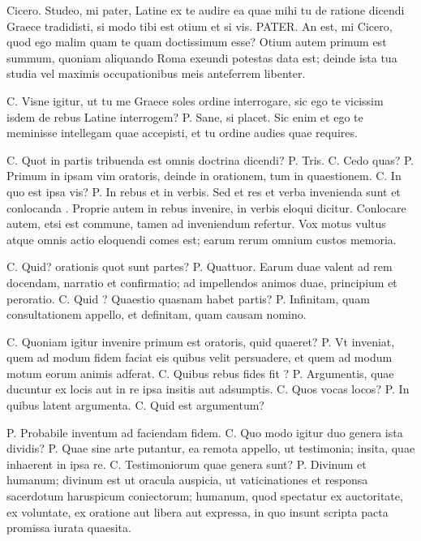 
 Cicero. Studeo, mi pater, Latine ex te audire ea quae mihi tu de ratione dicendi Graece tradidisti, si modo tibi est otium et si vis. PATER. An est, mi Cicero, quod ego malim quam te quam doctissimum esse? Otium autem primum est summum, quoniam aliquando Roma exeundi potestas data est; deinde ista tua studia vel maximis occupationibus meis anteferrem libenter.

 C. Visne igitur, ut tu me Graece soles ordine interrogare, sic ego te vicissim isdem de rebus Latine interrogem? P. Sane, si placet. Sic enim et ego te meminisse intellegam quae accepisti, et tu ordine audies quae requires.

 C. Quot in partis tribuenda est omnis doctrina dicendi? P. Tris. C. Cedo quas? P. Primum in ipsam vim oratoris, deinde in orationem, tum in quaestionem. C. In quo est ipsa vis? P. In rebus et in verbis. Sed et res et verba invenienda sunt et conlocanda . Proprie autem in rebus invenire, in verbis eloqui dicitur. Conlocare autem, etsi est commune, tamen ad inveniendum refertur. Vox motus vultus atque omnis actio eloquendi comes est; earum rerum omnium custos memoria.

 C. Quid? orationis quot sunt partes? P. Quattuor. Earum duae valent ad rem docendam, narratio et confirmatio; ad impellendos animos duae, principium et peroratio. C. Quid ? Quaestio quasnam habet partis? P. Infinitam, quam consultationem appello, et definitam, quam causam nomino.

 C. Quoniam igitur invenire primum est oratoris, quid quaeret? P. Vt inveniat, quem ad modum fidem faciat eis quibus velit persuadere, et quem ad modum motum eorum animis adferat. C. Quibus rebus fides fit ? P. Argumentis, quae ducuntur ex locis aut in re ipsa insitis aut adsumptis. C. Quos vocas locos? P. In quibus latent argumenta. C. Quid est argumentum?

 P. Probabile inventum ad faciendam fidem. C. Quo modo igitur duo genera ista dividis? P. Quae sine arte putantur, ea remota appello, ut testimonia; insita, quae inhaerent in ipsa re. C. Testimoniorum quae genera sunt? P. Divinum et humanum; divinum est ut oracula auspicia, ut vaticinationes et responsa sacerdotum haruspicum coniectorum; humanum, quod spectatur ex auctoritate, ex voluntate, ex oratione aut libera aut expressa, in quo insunt scripta pacta promissa iurata quaesita.

